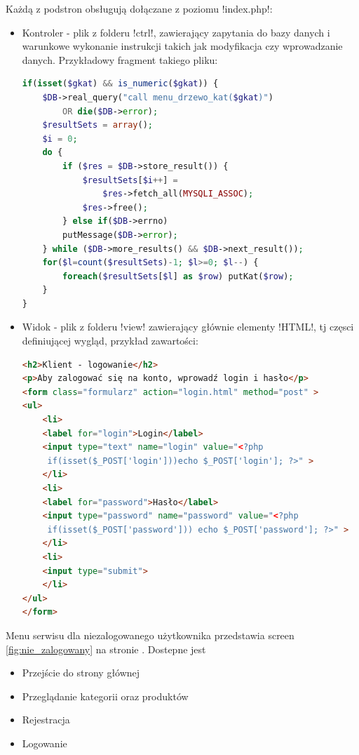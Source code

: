 Każdą z podstron obsługują dołączane z poziomu \s!index.php!:
\begin{itemize}
	\item Kontroler - plik z folderu \s!ctrl!, zawierający zapytania do bazy danych i warunkowe wykonanie instrukcji takich jak modyfikacja czy wprowadzanie danych. Przykładowy fragment takiego pliku:
\begin{lstlisting}[language=PHP]
if(isset($gkat) && is_numeric($gkat)) {
	$DB->real_query("call menu_drzewo_kat($gkat)") 
		OR die($DB->error);
	$resultSets = array();
	$i = 0;
	do {
		if ($res = $DB->store_result()) {
			$resultSets[$i++] = 
				$res->fetch_all(MYSQLI_ASSOC);
			$res->free();
		} else if($DB->errno)
		putMessage($DB->error);
	} while ($DB->more_results() && $DB->next_result());
	for($l=count($resultSets)-1; $l>=0; $l--) {
		foreach($resultSets[$l] as $row) putKat($row);
	}
}
\end{lstlisting}
	\item Widok - plik z folderu \s!view! zawierający głównie elementy \s!HTML!, tj częsci definiującej wygląd, przykład zawartości:
\begin{lstlisting}[language=HTML,showstringspaces=false]
<h2>Klient - logowanie</h2>
<p>Aby zalogować się na konto, wprowadź login i hasło</p>
<form class="formularz" action="login.html" method="post" >
<ul>
	<li>
	<label for="login">Login</label>
	<input type="text" name="login" value="<?php
	 if(isset($_POST['login']))echo $_POST['login']; ?>" >
	</li>
	<li>
	<label for="password">Hasło</label>
	<input type="password" name="password" value="<?php
	 if(isset($_POST['password'])) echo $_POST['password']; ?>" >
	</li>
	<li>
	<input type="submit">
	</li>
</ul>
</form>
\end{lstlisting}
\end{itemize}
Menu serwisu dla niezalogowanego użytkownika przedstawia screen \ref{fig:nie_zalogowany} na stronie \pageref{fig:nie_zalogowany}. Dostepne jest 
\begin{itemize}
	\item Przejście do strony głównej
	\item Przeglądanie kategorii oraz produktów 
	\item Rejestracja
	\item Logowanie
\end{itemize}


